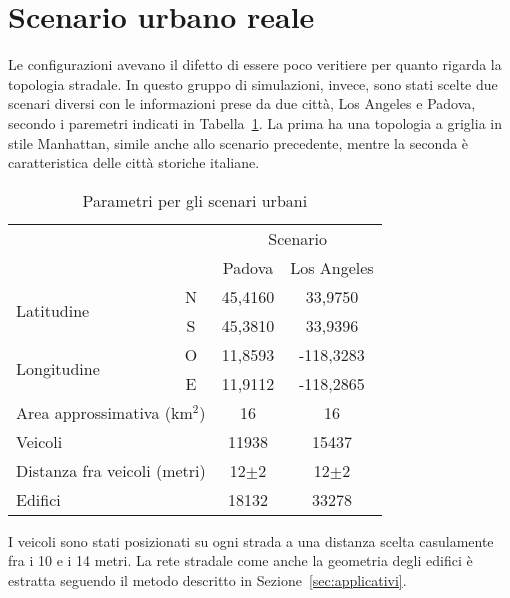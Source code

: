 \section{Scenario urbano reale} %
Le configurazioni avevano il difetto di essere poco veritiere per quanto rigarda la topologia stradale.
In questo gruppo di simulazioni, invece, sono stati scelte due scenari diversi con le informazioni prese da due città,
Los Angeles e Padova, secondo i paremetri indicati in Tabella~\ref{tab:parametri-simulazioni-pd-la}.
La prima ha una topologia a griglia in stile Manhattan, simile anche allo scenario precedente, mentre la seconda è caratteristica delle città storiche italiane.
%
\begin{table}[!h]
	\begin{center}
	  \begin{tabular}{| l | c | c | c | c |}
			\hline
			\multicolumn{3}{|m{.3\linewidth}|}{\multirow{2}{*}{}}														&		\multicolumn{2}{c|}{Scenario}				\\ \cline{4-5}
			\multicolumn{3}{|m{.3\linewidth}|}{}																						&		Padova				&			Los Angeles			\\ \hline \hline
			\multicolumn{2}{|m{.25\linewidth}|}{\multirow{2}{*}{Latitudine}}				&		N	 	& 	45,4160				&			33,9750					\\ \cline{3-5}
			\multicolumn{2}{|m{.25\linewidth}|}{}																		&		S	 	& 	45,3810				&			33,9396					\\ \hline
			\multicolumn{2}{|l|}{\multirow{2}{*}{Longitudine}}											&		O	 	& 	11,8593				&			-118,3283				\\ \cline{3-5}
			\multicolumn{2}{|l|}{}																									&		E	 	& 	11,9112				&			-118,2865				\\ \hline
			\multicolumn{3}{|l|}{Area approssimativa (km$^2$)}															&			16					&					16					\\ \hline
			\multicolumn{3}{|l|}{Veicoli}																										&		11938					&					15437				\\ \hline
			\multicolumn{3}{|l|}{Distanza fra veicoli (metri)}															&		12$\pm$2			&			12$\pm$2				\\ \hline
			\multicolumn{3}{|l|}{Edifici}																										&		18132					&					33278				\\
			\hline
	  \end{tabular}
	\end{center}
	\caption{Parametri per gli scenari urbani}
	\label{tab:parametri-simulazioni-pd-la}
\end{table}
%
I veicoli sono stati posizionati su ogni strada a una distanza scelta casulamente fra i 10 e i 14 metri.
La rete stradale come anche la geometria degli edifici è estratta seguendo il metodo descritto in Sezione~\ref{sec:applicativi}.










%
